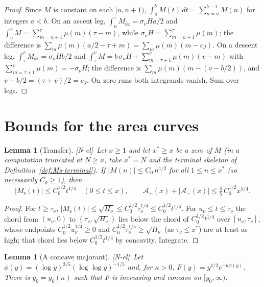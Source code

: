 \documentclass[11pt]{amsart}
\numberwithin{equation}{section}
\theoremstyle{plain}
\newtheorem{lemma}[theorem]{Lemma}
\theoremstyle{definition}
\theoremstyle{remark}
\newcommand{\Ms}{M_{\mathrm{s}}}
\newcommand{\Msk}{M_{\mathrm{sk}}}
\newcommand{\Ap}{\mathcal{A}_{+}}
\newcommand{\Am}{\mathcal{A}_{-}}
\newcommand{\tagNE}{\textup{[N-el]}}
\begin{document}
\begin{proof}
Since $M$ is constant on each $[n,n+1)$, $\int_a^bM(t)\,dt=\sum_{n=a}^{b-1}M(n)$
for integers $a<b$. On an ascent leg, $\int_{u}^{\tau}\Msk=\sigma_\nu H a/2$ and
$\int_u^\tau M=\sum_{m=u+1}^{\tau}\mu(m)(\tau-m)$, while
$\sigma_\nu H=\sum_{m=u+1}^{\tau}\mu(m)$; the difference is
$\sum_m\mu(m)(a/2-\tau+m)=\sum_m\mu(m)(m-c_J)$. On a descent leg,
$\int_\tau^v\Msk=\sigma_\nu Hb/2$ and
$\int_\tau^vM=b\,\sigma_\nu H+\sum_{m=\tau+1}^{v}\mu(m)(v-m)$ with
$\sum_{m=\tau+1}^{v}\mu(m)=-\sigma_\nu H$; the difference is
$\sum_m\mu(m)(m-(v-b/2))$, and $v-b/2=(\tau+v)/2=c_J$. On zero runs
both integrands vanish. Sum over legs.
\end{proof}


\section{Bounds for the area curves}
\label{sec:bounds}

\begin{lemma}[Transfer]
\label{lem:transfer}
\tagNE\ Let $x\ge1$ and let $x^*\ge x$ be a zero of $M$ (in a computation truncated
at $N\ge x$, take $x^*=N$ and the terminal skeleton of
Definition~\ref{def:Ms-terminal}). If $|M(n)|\le C_0\,n^{1/2}$ for all
$1\le n\le x^*$ (so necessarily $C_0\ge1$), then
\begin{equation}
\label{eq:transfer_bound}
  |\Ms(t)|\le C_0^{1/2}t^{1/4}\quad(0\le t\le x),\qquad
  \Ap(x)+|\Am(x)|\le\tfrac45\,C_0^{1/2}x^{5/4}.
\end{equation}
\end{lemma}

\begin{proof}
For $t\ge\tau_\nu$, $|\Ms(t)|\le\sqrt{H_\nu}\le C_0^{1/2}\tau_\nu^{1/4}\le
C_0^{1/2}t^{1/4}$. For $u_\nu\le t\le\tau_\nu$ the chord from $(u_\nu,0)$ to
$(\tau_\nu,\sqrt{H_\nu})$ lies below the chord of $C_0^{1/2}t^{1/4}$ over
$[u_\nu,\tau_\nu]$, whose endpoints $C_0^{1/2}u_\nu^{1/4}\ge0$ and
$C_0^{1/2}\tau_\nu^{1/4}\ge\sqrt{H_\nu}$ (as $\tau_\nu\le x^*$) are at
least as high; that chord lies below $C_0^{1/2}t^{1/4}$ by concavity.
Integrate.
\end{proof}

\begin{lemma}[A concave majorant]
\label{lem:concave-majorant}
\tagNE\ Let $\phi(y)=(\log y)^{3/5}(\log\log y)^{-1/5}$ and, for $\kappa>0$,
$F(y)=y^{1/2}e^{-\kappa\phi(y)}$. There is $y_0=y_0(\kappa)$ such that $F$
is increasing and concave on $[y_0,\infty)$.
\end{lemma}
\end{document}
